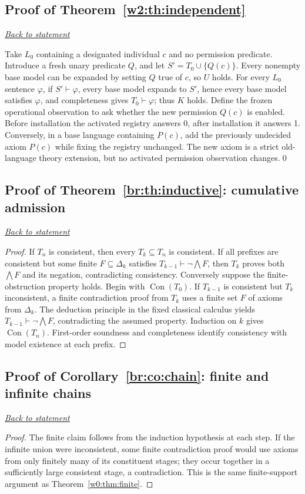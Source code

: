 \documentclass[11pt,letterpaper]{article}
\theoremstyle{definition}\newtheorem{definition}[theorem]{Definition}\newtheorem{example}[theorem]{Example}
\theoremstyle{remark}\newtheorem{remark}[theorem]{Remark}
\newcommand{\Con}{\operatorname{Con}}
\newcommand{\backlink}[1]{\noindent\hyperref[#1]{\textit{Back to statement}}\par\smallskip}
\begin{document}
\subsection{Proof of Theorem~\ref{w2:th:independent}}\label{w2:pr:independent}\backlink{w2:th:independent}
Take $L_0$ containing a designated individual $c$ and no permission predicate. Introduce a fresh unary predicate $Q$, and let $S'=T_0\cup\{Q(c)\}$. Every nonempty base model can be expanded by setting $Q$ true of $c$, so $U$ holds. For every $L_0$ sentence $\varphi$, if $S'\vdash\varphi$, every base model expands to $S'$, hence every base model satisfies $\varphi$, and completeness gives $T_0\vdash\varphi$; thus $K$ holds. Define the frozen operational observation to ask whether the new permission $Q(c)$ is enabled. Before installation the activated registry answers 0, after installation it answers 1. Conversely, in a base language containing $P(c)$, add the previously undecided axiom $P(c)$ while fixing the registry unchanged. The new axiom is a strict old-language theory extension, but no activated permission observation changes.\qed

\subsection{Proof of Theorem~\ref{br:th:inductive}: cumulative admission}\label{br:pr:inductive}
\backlink{br:th:inductive}
\begin{proof}
If $T_n$ is consistent, then every $T_k\subseteq T_n$ is consistent.
If all prefixes are consistent but some finite $F\subseteq\Delta_k$ satisfies
$T_{k-1}\vdash\neg\bigwedge F$, then $T_k$ proves both $\bigwedge F$
and its negation, contradicting consistency. Conversely suppose the
finite-obstruction property holds. Begin with $\Con(T_0)$. If $T_{k-1}$
is consistent but $T_k$ inconsistent, a finite contradiction proof from
$T_k$ uses a finite set $F$ of axioms from $\Delta_k$. The deduction
principle in the fixed classical calculus yields
$T_{k-1}\vdash\neg\bigwedge F$, contradicting the assumed property.
Induction on $k$ gives $\Con(T_n)$. First-order soundness and completeness
identify consistency with model existence at each prefix.
\end{proof}

\subsection{Proof of Corollary~\ref{br:co:chain}: finite and infinite chains}\label{br:pr:chain}
\backlink{br:co:chain}
\begin{proof}
The finite claim follows from the induction hypothesis at each step.
If the infinite union were inconsistent, some finite contradiction proof
would use axioms from only finitely many of its constituent stages;
they occur together in a sufficiently large consistent stage, a
contradiction.  This is the same finite-support argument as
Theorem~\ref{w0:thm:finite}.
\end{proof}
\end{document}

